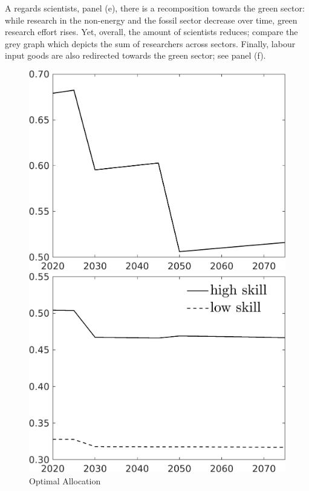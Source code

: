 A regards scientists, panel (e), there is a recomposition           towards the green sector: while research in the non-energy and the fossil sector decrease over time, green research effort rises. Yet, overall, the amount of scientists reduces; compare the grey graph which depicts the sum of researchers across sectors. 
Finally, labour input goods are also redirected towards the green sector; see panel (f). 

\begin{figure}[h!!]
	\centering
	\caption{Optimal Allocation }\label{fig:optAll}
	
	
	\begin{minipage}[]{0.32\textwidth}
		\includegraphics[width=1\textwidth]{../../codding_model/own_basedOnFried/optimalPol_190722_tidiedUp/figures/all_July22/C_SingleAltPolOPT_T_NoTaus_regime3_spillover0_noskill0_sep1_xgrowth0_etaa0.79.png}
	\end{minipage}
	\begin{minipage}[]{0.32\textwidth}
		\includegraphics[width=1\textwidth]{../../codding_model/own_basedOnFried/optimalPol_190722_tidiedUp/figures/all_July22/SingleJointTOT_regime3_OPT_T_NoTaus_Labour_spillover0_noskill0_sep1_xgrowth0_extern0_etaa0.79_lgd1.png}

\end{minipage}
\end{figure}
